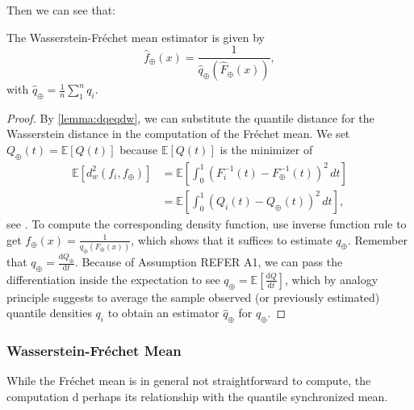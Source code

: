 Then we can see that:
\begin{lemma}
    The Wasserstein-Fréchet mean estimator is given by
    \begin{equation}
        \hat{f}_\oplus(x) = \frac{1}{\hat{q}_\oplus(\hat{F}_\oplus(x))},
    \end{equation}
    with $\hat{q}_\oplus = \frac{1}{n} \sum_{1}^{n} q_i$.
\end{lemma}
\begin{proof}
    By \ref{lemma:dqeqdw}, we can substitute the quantile distance for the
    Wasserstein distance in the computation of the Fréchet mean. We set
    $Q_\oplus(t) = \mathbb{E}[Q(t)]$ because $\mathbb{E}[Q(t)]$ is the minimizer of
    \begin{equation}
    \label{eq:wf_mean}
        \begin{aligned}
            \mathbb{E}[d_w^2(f_i, f_\oplus)]	& =
            \mathbb{E}\left[\int_{0}^{1}(F_i^{-1}(t) - F_\oplus^{-1}(t))^2 \,dt\right] \\
                                    & =
            \mathbb{E}\left[\int_{0}^{1}(Q_i(t) - Q_\oplus(t))^2 \,dt\right],
        \end{aligned}
    \end{equation}
    see \citet[Chapter~3.1.4]{PanaretosZemel2020}. To compute the corresponding density
    function, use inverse function rule to get
    $f_\oplus(x) = \frac{1}{q_\oplus(F_\oplus(x))}$, which shows that it suffices to
    estimate $q_\oplus$. Remember that
    $q_\oplus = \frac{\mathrm{d}Q_\oplus}{\mathrm{d}t}$. Because of Assumption REFER A1,
    we can pass the differentiation inside the expectation to see
    $q_\oplus = \mathbb{E}\left[\frac{\mathrm{d}Q}{\mathrm{d}t}\right]$, which by analogy
    principle suggests to average the sample observed (or previously estimated)
    quantile densities $q_i$ to obtain an estimator $\hat{q}_\oplus$ for $q_\oplus$.
\end{proof}


\subsubsection{Wasserstein-Fréchet Mean}
\label{sec:wasserstein_f_mean}
While the Fréchet mean is in general not straightforward to compute, the computation
d perhaps its relationship with the quantile synchronized mean.
